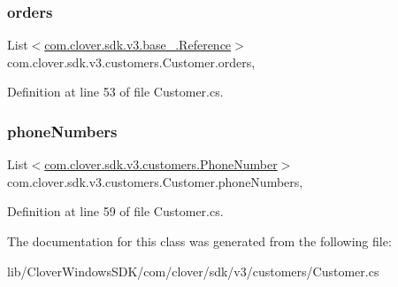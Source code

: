 \mbox{\label{classcom_1_1clover_1_1sdk_1_1v3_1_1customers_1_1_customer_a161dbf9903d526cff029bc3d6ee47f4d}} 
\subsubsection{\texorpdfstring{orders}{orders}}
{\footnotesize\ttfamily List$<$\hyperlink{classcom_1_1clover_1_1sdk_1_1v3_1_1base___1_1_reference}{com.\+clover.\+sdk.\+v3.\+base\+\_\+.\+Reference}$>$ com.\+clover.\+sdk.\+v3.\+customers.\+Customer.\+orders\hspace{0.3cm}{\ttfamily [get]}, {\ttfamily [set]}}



Definition at line 53 of file Customer.\+cs.

\mbox{\label{classcom_1_1clover_1_1sdk_1_1v3_1_1customers_1_1_customer_acab51810c72a41fd25a741aa1d4e618f}} 
\subsubsection{\texorpdfstring{phone\+Numbers}{phoneNumbers}}
{\footnotesize\ttfamily List$<$\hyperlink{classcom_1_1clover_1_1sdk_1_1v3_1_1customers_1_1_phone_number}{com.\+clover.\+sdk.\+v3.\+customers.\+Phone\+Number}$>$ com.\+clover.\+sdk.\+v3.\+customers.\+Customer.\+phone\+Numbers\hspace{0.3cm}{\ttfamily [get]}, {\ttfamily [set]}}



Definition at line 59 of file Customer.\+cs.



The documentation for this class was generated from the following file\+:\begin{DoxyCompactItemize}
\item 
lib/\+Clover\+Windows\+S\+D\+K/com/clover/sdk/v3/customers/Customer.\+cs\end{DoxyCompactItemize}
